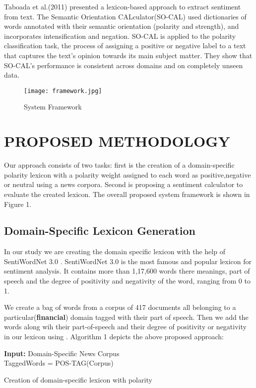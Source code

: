 \documentclass[conference]{IEEEtran}
\begin{document}
Taboada et al.(2011) \cite{c7} presented a lexicon-based approach to extract sentiment from text. The Semantic Orientation
CALculator(SO-CAL) used dictionaries of words annotated with their semantic orientation
(polarity and strength), and incorporates intensification and negation. SO-CAL is applied to the
polarity classification task, the process of assigning a positive or negative label to a text that
captures the text’s opinion towards its main subject matter. They show that SO-CAL’s performance
is consistent across domains and on completely unseen data.
\begin{figure*}[h!]
	\centering
	\texttt{[image: framework.jpg]}
	\caption{System Framework}
	\label{fig:framework}
\end{figure*}


	\section{PROPOSED METHODOLOGY}
Our approach consists of two tasks: first is the creation of a domain-specific polarity lexicon with a polarity weight assigned to each word as positive,negative or neutral using a news corpora. Second is proposing a sentiment calculator to evaluate the created lexicon. The overall proposed system framework is shown in Figure 1.

\subsection{Domain-Specific Lexicon Generation}
In our study we are creating the domain specific lexicon with the help of SentiWordNet 3.0 \cite{c1}. SentiWordNet 3.0 is the most famous and popular lexicon for sentiment analysis. It contains more than 1,17,600 words  there meanings, part of speech  and the degree of positivity and negativity of the word, ranging from 0 to 1.

We create a bag of words from a corpus of 417 documents all belonging to a particular(\textbf{financial}) domain tagged with their part of speech. Then we add the words along wih their part-of-speech and their degree of positivity or negativity in our lexicon using \cite{c1}. Algorithm 1 depicts the above proposed approach:  
\begin{algorithm}
	\SetAlgoLined
	\textbf{Input:} Domain-Specific News Corpus\\
	TaggedWords = POS-TAG(Corpus)\\
	
	\caption{Creation of domain-specific lexicon with polarity}
\end{algorithm}
\end{document}
